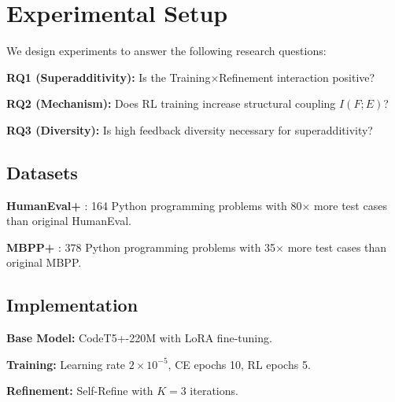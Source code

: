 \section{Experimental Setup}
\label{sec:experiments}

We design experiments to answer the following research questions:

\textbf{RQ1 (Superadditivity):} Is the Training$\times$Refinement interaction positive?

\textbf{RQ2 (Mechanism):} Does RL training increase structural coupling $I(F;E)$?

\textbf{RQ3 (Diversity):} Is high feedback diversity necessary for superadditivity?

\subsection{Datasets}

\textbf{HumanEval+} \cite{liu2024evalplus}: 164 Python programming problems with 80$\times$ more test cases than original HumanEval.

\textbf{MBPP+} \cite{liu2024evalplus}: 378 Python programming problems with 35$\times$ more test cases than original MBPP.

\subsection{Implementation}

\textbf{Base Model:} CodeT5+-220M \cite{wang2023codet5plus} with LoRA \cite{hu2022lora} fine-tuning.

\textbf{Training:} Learning rate $2 \times 10^{-5}$, CE epochs 10, RL epochs 5.

\textbf{Refinement:} Self-Refine \cite{madaan2023selfrefine} with $K=3$ iterations.
